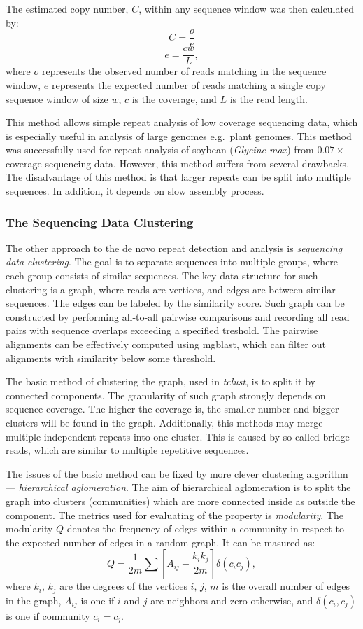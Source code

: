 The estimated copy number, $C$, within any sequence window was then calculated by\cite{swaminathan2007global}:
$$C = \frac{o}{e}$$
$$e = \frac{cw}{L},$$
where $o$ represents the observed number of reads matching in the sequence window, $e$ represents the expected number of reads matching a single copy sequence window of size $w$, $c$ is the coverage, and $L$ is the read length.

This method allows simple repeat analysis of low coverage sequencing data, which is especially useful in analysis of large genomes e.g.\ plant genomes. This method was successfully used for repeat analysis of soybean (\textit{Glycine max}) from $0.07\times$ coverage sequencing data\cite{swaminathan2007global}.
However, this method suffers from several drawbacks. The disadvantage of this method is that larger repeats can be split into multiple sequences. In addition, it depends on slow assembly process.

\subsubsection{The Sequencing Data Clustering}

The other approach to the de novo repeat detection and analysis is \emph{sequencing data clustering}. The goal is to separate sequences into multiple groups, where each group consists of similar sequences.
The key data structure for such clustering is a graph, where reads are vertices, and edges are between similar sequences. The edges can be labeled by the similarity score. Such graph can be constructed by performing all-to-all pairwise comparisons and recording all read pairs with sequence overlaps exceeding a specified treshold\cite{pertea2003tigr, novak2010graph}. The pairwise alignments can be effectively computed using mgblast\cite{pertea2003tigr}, which can filter out alignments with similarity below some threshold.

The basic method of clustering the graph, used in \emph{tclust}\cite{pertea2003tigr}, is to split it by connected components. The granularity of such graph strongly depends on sequence coverage. The higher the coverage is, the smaller number and bigger clusters will be found in the graph. Additionally, this methods may merge multiple independent repeats into one cluster. This is caused by so called bridge reads, which are similar to multiple repetitive sequences.

The issues of the basic method can be fixed by more clever clustering algorithm --- \emph{hierarchical aglomeration}. The aim of hierarchical aglomeration is to split the graph into clusters (communities) which are more connected inside as outside the component. The metrics used for evaluating of the property is \emph{modularity}.
The modularity $Q$ denotes the frequency of edges within a community in respect to the expected number of edges in a random graph. It can be masured as\cite{novak2010graph}:
$$Q = \frac{1}{2m}\sum\left[A_{ij}-\frac{k_i k_j}{2m}\right] \delta(c_i c_j),$$
where $k_i,\, k_j$ are the degrees of the vertices $i,\,j$, $m$ is the overall number of edges in the graph, $A_{ij}$ is one if $i$ and $j$ are neighbors and zero otherwise, and $\delta(c_i, c_j)$ is one if community $c_i = c_j$.


